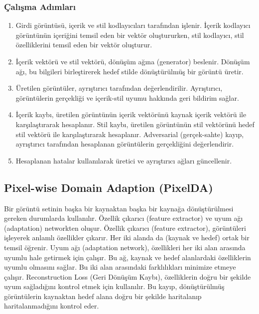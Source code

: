 \subsubsection{Çalışma Adımları}

\begin{enumerate}
    \item Girdi görüntüsü, içerik ve stil kodlayıcıları tarafından işlenir. İçerik kodlayıcı görüntünün içeriğini temsil eden bir vektör oluştururken, stil kodlayıcı, stil özelliklerini temsil eden bir vektör oluşturur.
    \item İçerik vektörü ve stil vektörü, dönüşüm ağına (generator) beslenir. Dönüşüm ağı, bu bilgileri birleştirerek hedef stilde dönüştürülmüş bir görüntü üretir.
    \item Üretilen görüntüler, ayrıştırıcı tarafından değerlendirilir. Ayrıştırıcı, görüntülerin gerçekliği ve içerik-stil uyumu hakkında geri bildirim sağlar.
    \item İçerik kaybı, üretilen görüntünün içerik vektörünü kaynak içerik vektörü ile karşılaştırarak hesaplanır. Stil kaybı, üretilen görüntünün stil vektörünü hedef stil vektörü ile karşılaştırarak hesaplanır. Adversarial (gerçek-sahte) kayıp, ayrıştırıcı tarafından hesaplanan görüntülerin gerçekliğini değerlendirir.
    \item Hesaplanan hatalar kullanılarak üretici ve ayrıştırıcı ağları güncellenir.
\end{enumerate}

\subsection{Pixel-wise Domain Adaption (PixelDA)}

Bir görüntü setinin başka bir kaynaktan başka bir kaynağa dönüştürülmesi gereken durumlarda kullanılır. Özellik çıkarıcı (feature extractor) ve uyum ağı (adaptation) networkten oluşur. Özellik çıkarıcı (feature extractor), görüntüleri işleyerek anlamlı özellikler çıkarır. Her iki alanda da (kaynak ve hedef) ortak bir temsil öğrenir. Uyum ağı (adaptation network), özellikleri her iki alan arasında uyumlu hale getirmek için çalışır. Bu ağ, kaynak ve hedef alanlardaki özelliklerin uyumlu olmasını sağlar. Bu iki alan arasındaki farklılıkları minimize etmeye çalışır.  Reconstruction Loss (Geri Dönüşüm Kaybı), özelliklerin doğru bir şekilde uyum sağladığını kontrol etmek için kullanılır. Bu kayıp, dönüştürülmüş görüntülerin kaynaktan hedef alana doğru bir şekilde haritalanıp haritalanmadığını kontrol eder. 

